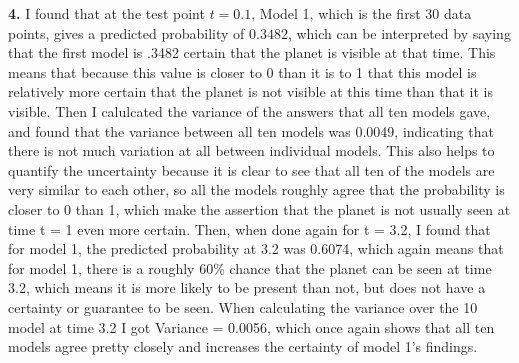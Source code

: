 \documentclass[submit]{harvardml}
\begin{document}
\textbf{4.} I found that at the test point $t = 0.1$, Model 1, which is the first 30 data points, gives a predicted probability of $0.3482$, which 
can be interpreted by saying that the first model is .3482 certain that the planet is visible at that time. This means that because this value is closer to 0 
than it is to 1 that this model is relatively more certain that the planet is not visible at this time than that it is visible. Then I calulcated the variance of the answers 
that all ten models gave, and found that the variance between all ten models was 0.0049, indicating that there is not much variation at all between individual models. 
This also helps to quantify the uncertainty because it is clear to see that all ten of the models are very similar to each other, so all the models roughly agree that 
the probability is closer to 0 than 1, which make the assertion that the planet is not usually seen at time t = 1 even more certain. Then, when done again for t = 3.2, I found that
for model 1, the predicted probability at 3.2 was 0.6074, which again means that for model 1, there is a roughly 60\% chance that the planet can be seen at time 3.2, which means it 
is more likely to be present than not, but does not have a certainty or guarantee to be seen. When calculating the variance over the 10 model at time 3.2 I got Variance = 0.0056, which once again shows that all ten models agree 
pretty closely and increases the certainty of model 1's findings.  \\\\
\end{document}
